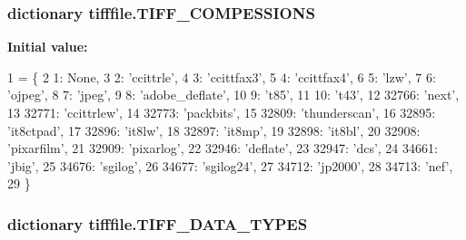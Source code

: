 \hypertarget{namespacetifffile_aa116c730a08b223685d7dedb1ba645a7}{
\subsubsection[{T\-I\-F\-F\-\_\-\-C\-O\-M\-P\-E\-S\-S\-I\-O\-N\-S}]{\setlength{\rightskip}{0pt plus 5cm}dictionary tifffile.\-T\-I\-F\-F\-\_\-\-C\-O\-M\-P\-E\-S\-S\-I\-O\-N\-S}}\label{namespacetifffile_aa116c730a08b223685d7dedb1ba645a7}
{\bfseries Initial value\-:}
\begin{DoxyCode}
1 = \{
2     1: \textcolor{keywordtype}{None},
3     2: \textcolor{stringliteral}{'ccittrle'},
4     3: \textcolor{stringliteral}{'ccittfax3'},
5     4: \textcolor{stringliteral}{'ccittfax4'},
6     5: \textcolor{stringliteral}{'lzw'},
7     6: \textcolor{stringliteral}{'ojpeg'},
8     7: \textcolor{stringliteral}{'jpeg'},
9     8: \textcolor{stringliteral}{'adobe\_deflate'},
10     9: \textcolor{stringliteral}{'t85'},
11     10: \textcolor{stringliteral}{'t43'},
12     32766: \textcolor{stringliteral}{'next'},
13     32771: \textcolor{stringliteral}{'ccittrlew'},
14     32773: \textcolor{stringliteral}{'packbits'},
15     32809: \textcolor{stringliteral}{'thunderscan'},
16     32895: \textcolor{stringliteral}{'it8ctpad'},
17     32896: \textcolor{stringliteral}{'it8lw'},
18     32897: \textcolor{stringliteral}{'it8mp'},
19     32898: \textcolor{stringliteral}{'it8bl'},
20     32908: \textcolor{stringliteral}{'pixarfilm'},
21     32909: \textcolor{stringliteral}{'pixarlog'},
22     32946: \textcolor{stringliteral}{'deflate'},
23     32947: \textcolor{stringliteral}{'dcs'},
24     34661: \textcolor{stringliteral}{'jbig'},
25     34676: \textcolor{stringliteral}{'sgilog'},
26     34677: \textcolor{stringliteral}{'sgilog24'},
27     34712: \textcolor{stringliteral}{'jp2000'},
28     34713: \textcolor{stringliteral}{'nef'},
29 \}
\end{DoxyCode}
\hypertarget{namespacetifffile_ac5fc4c0a03f203af8324b9cfa74982fb}{
\subsubsection[{T\-I\-F\-F\-\_\-\-D\-A\-T\-A\-\_\-\-T\-Y\-P\-E\-S}]{\setlength{\rightskip}{0pt plus 5cm}dictionary tifffile.\-T\-I\-F\-F\-\_\-\-D\-A\-T\-A\-\_\-\-T\-Y\-P\-E\-S}}\label{namespacetifffile_ac5fc4c0a03f203af8324b9cfa74982fb}
